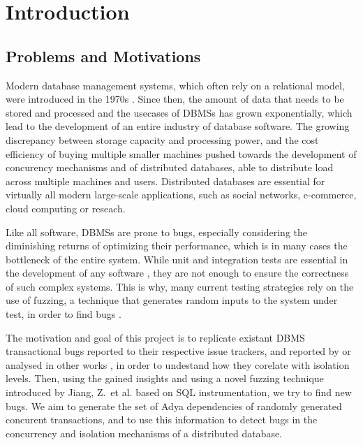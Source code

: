 \newcommand{\package}{\emph}

\chapter{Introduction}
\label{chap:introduction}
\section{Problems and Motivations}

Modern database management systems, which often rely on a relational model, were introduced in the 1970s \cite{codd1970relational}. Since then, the amount of data that needs to be stored and processed and the usecases of DBMSs has grown exponentially, which lead to the development of an entire industry of database software.
The growing discrepancy between storage capacity and processing power, and the cost efficiency of buying multiple smaller machines \cite{barroso2022datacenter} pushed towards the development of concurency mechanisms and of distributed databases, able to distribute load across multiple machines and users. Distributed databases are essential for virtually all modern large-scale applications, such as social networks, e-commerce, cloud computing or reseach.

Like all software, DBMSs are prone to bugs, especially considering the diminishing returns of optimizing their performance, which is in many cases the bottleneck of the entire system. While unit and integration tests are essential in the development of any software \cite{testimblogtests}, they are not enough to ensure the correctness of such complex systems. This is why, many current testing strategies rely on the use of fuzzing, a technique that generates random inputs to the system under test, in order to find bugs \cite{liang2018fuzzing}.

The motivation and goal of this project is to replicate existant DBMS transactional bugs reported to their respective issue trackers, and reported by or analysed in other works \cite{jiang2023detecting, cui2022differentially_ASE2022, dou2023detecting_ICSE2023, cui2024understanding_ICSE2024}, in order to undestand how they corelate with isolation levels. Then, using the gained insights and using a novel fuzzing technique introduced by Jiang, Z.\ et al. \cite{jiang2023detecting} based on SQL instrumentation, we try to find new bugs. We aim to generate the set of Adya dependencies \cite{adya1999weak} of randomly generated concurent transactions, and to use this information to detect bugs in the concurrency and isolation mechanisms of a distributed database.




